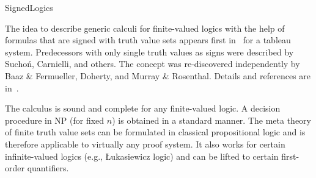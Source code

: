 \begin{entry}{SignedLogics}
\begin{clarifications}
\end{clarifications}

\begin{history}
  The idea to describe generic calculi for finite-valued logics with
  the help of formulas that are signed with truth value sets appears
  first in~\cite{Haehnle90} for a tableau system. Predecessors with
  only single truth values as signs were described by Sucho\'n,
  Carnielli, and others. The concept was re-discovered independently
  by Baaz \& Fermueller, Doherty, and Murray \& Rosenthal.  Details
  and references are in~\cite{BFS01,Haehnle01}.
\end{history}

\begin{technicalities}
  The calculus is sound and complete for any finite-valued logic. A
  decision procedure in NP (for fixed $n$) is obtained in a standard
  manner.  The meta theory of finite truth value sets can be
  formulated in classical propositional logic and is therefore
  applicable to virtually any proof system. It also works for certain
  infinite-valued logics (e.g., {\L}ukasiewicz logic) and can be
  lifted to certain first-order quantifiers.
\end{technicalities}

\end{entry}

